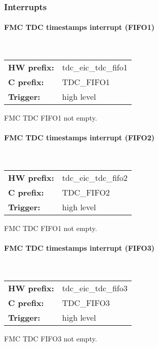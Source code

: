 \subsubsection{Interrupts}
\paragraph*{FMC TDC timestamps interrupt (FIFO1)}\mbox{}\\\vskip 6pt
\begin{small}
\begin{tabular}{l l }
{\bf HW prefix:}  & tdc\_eic\_tdc\_fifo1\\
{\bf C prefix:}  & TDC\_FIFO1\\
{\bf Trigger:}  & high level\\
\end{tabular}

\end{small}
\vspace{12pt}
FMC TDC FIFO1 not empty.
\paragraph*{FMC TDC timestamps interrupt (FIFO2)}\mbox{}\\\vskip 6pt
\begin{small}
\begin{tabular}{l l }
{\bf HW prefix:}  & tdc\_eic\_tdc\_fifo2\\
{\bf C prefix:}  & TDC\_FIFO2\\
{\bf Trigger:}  & high level\\
\end{tabular}

\end{small}
\vspace{12pt}
FMC TDC FIFO1 not empty.
\paragraph*{FMC TDC timestamps interrupt (FIFO3)}\mbox{}\\\vskip 6pt
\begin{small}
\begin{tabular}{l l }
{\bf HW prefix:}  & tdc\_eic\_tdc\_fifo3\\
{\bf C prefix:}  & TDC\_FIFO3\\
{\bf Trigger:}  & high level\\
\end{tabular}

\end{small}
\vspace{12pt}
FMC TDC FIFO3 not empty.
